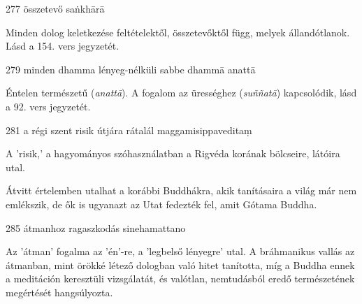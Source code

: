 
\begin{notesdescription}

\item[{277}
{összetevő}
{saṅkhārā}] \hfill\par

Minden dolog keletkezése feltételektől, összetevőktől függ, melyek állandótlanok. Lásd a 154. vers jegyzetét.

\item[{279}
{minden dhamma lényeg-nélküli}
{sabbe dhammā anattā}] \hfill\par

Éntelen természetű (\textit{anattā}). A fogalom az ürességhez (\textit{suññatā}) kapcsolódik, lásd a 92. vers jegyzetét.

\item[{281}
{a régi szent risik útjára rátalál}
{maggamisippaveditaṃ}] \hfill\par

A 'risik,' a hagyományos szóhasználatban a Rigvéda korának bölcseire, látóira utal.

Átvitt értelemben utalhat a korábbi Buddhákra, akik tanításaira a világ már nem emlékszik, de ők is ugyanazt az Utat fedezték fel, amit Gótama Buddha.

\item[{285}
{átmanhoz ragaszkodás}
{sinehamattano}] \hfill\par

Az 'átman' fogalma az 'én'-re, a 'legbelső lényegre' utal. A bráhmanikus vallás az átmanban, mint örökké létező dologban való hitet tanította, míg a Buddha ennek a meditáción keresztüli vizsgálatát, és valótlan, nemtudásból eredő természetének megértését hangsúlyozta.

\end{notesdescription}

